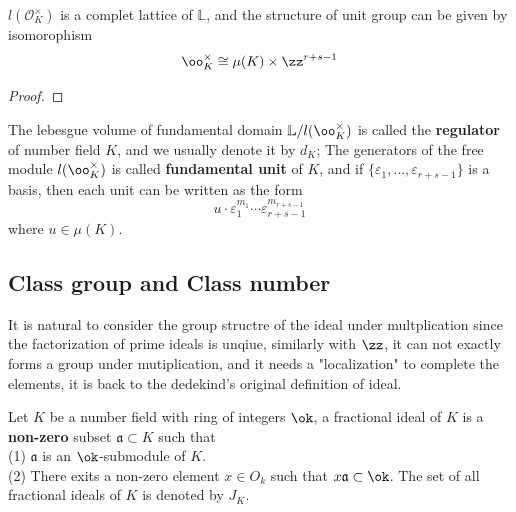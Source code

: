 \begin{colortheorem}[Dirichlet]
    \(l(\mathcal{O}_K^\times)\) is a complet lattice of \(\mathbb{L}\), and the structure of unit group can be given by isomorophism
    \[\oo_K^\times \cong \mu(K) \times \zz^{r+s - 1}\]
\end{colortheorem}

\begin{proof}
    
\end{proof}

The lebesgue volume of fundamental domain \(\mathbb{L}/ l(\oo_K^\times)\) is called the \textbf{regulator} of number field \(K\), and we usually denote it by \(d_K\); The generators of the free module \(l(\oo_K^\times)\) is called \textbf{fundamental unit} of \(K\), and if \(\{\varepsilon_1,\dots,\varepsilon_{r+s-1}\}\) is a basis, then each unit can be written as the form 
\[u \cdot \varepsilon_1^{m_1} \cdots \varepsilon_{r+s-1}^{m_{r+s-1}}\]
where \(u \in \mu(K)\).

    \newpage
    \subsection{Class group and Class number}

It is natural to consider the group structre of the ideal under multplication since the factorization of prime ideals is unqiue, similarly with \(\zz\), it can not exactly forms a group under mutiplication, and it needs a "localization" to complete the elements, it is back to the dedekind's original definition of ideal.

\begin{definition}
    Let \(K\) be a number field with ring of integers \(\ok\), a fractional ideal of \(K\) is a \textbf{non-zero} subset \(\mathfrak{a} \subset K\) such that\\
    (1) \(\mathfrak{a}\) is an \(\ok\)-submodule of \(K\).\\
    (2) There exits a non-zero element \(x \in O_k\) such that \(x \mathfrak{a} \subset \ok\).
    The set of all fractional ideals of \(K\) is denoted by \(J_K\).
\end{definition}

